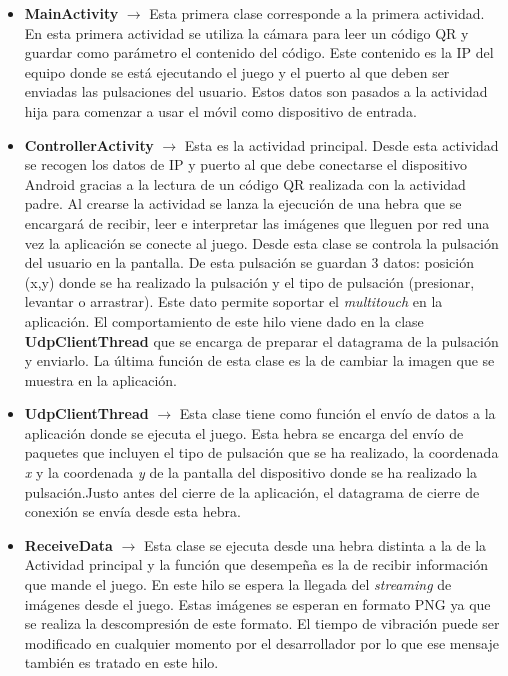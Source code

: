 \begin {itemize}
\item \textbf{MainActivity} $\rightarrow$ Esta primera clase corresponde a la primera actividad. En esta primera actividad se utiliza la c\'amara para leer un c\'odigo QR y guardar como par\'ametro el contenido del c\'odigo. Este contenido es la IP del equipo donde se est\'a ejecutando el juego y el puerto al que deben ser enviadas las pulsaciones del usuario. Estos datos son pasados a la actividad hija para comenzar a usar el m\'ovil como dispositivo de entrada.
\item \textbf{ControllerActivity} $\rightarrow$ Esta es la actividad principal. Desde esta actividad se recogen los datos de IP y puerto al que debe conectarse el dispositivo Android gracias a la lectura de un c\'odigo QR realizada con la actividad padre. Al crearse la actividad se lanza la ejecuci\'on de una hebra que se encargar\'a de recibir, leer e interpretar las im\'agenes que lleguen por red una vez la aplicaci\'on se conecte al juego. Desde esta clase se controla la pulsaci\'on del usuario en la pantalla. De esta pulsaci\'on se guardan 3 datos: posici\'on (x,y) donde se ha realizado la pulsaci\'on y el tipo de pulsaci\'on (presionar, levantar o arrastrar). Este dato permite soportar el \textit{multitouch} en la aplicaci\'on. El comportamiento de este hilo viene dado en la clase \textbf{UdpClientThread} que se encarga de preparar el datagrama de la pulsaci\'on y enviarlo. La \'ultima funci\'on de esta clase es la de cambiar la imagen que se muestra en la aplicaci\'on. 

\item \textbf{UdpClientThread} $\rightarrow$ Esta clase tiene como funci\'on el env\'io de datos a la aplicaci\'on donde se ejecuta el juego. Esta hebra se encarga del env\'io de paquetes que incluyen el tipo de pulsaci\'on que se ha realizado, la coordenada \textit{x} y la coordenada \textit{y} de la pantalla del dispositivo donde se ha realizado la pulsaci\'on.Justo antes del cierre de la aplicaci\'on, el datagrama de cierre de conexi\'on se env\'ia desde esta hebra.

\item \textbf{ReceiveData} $\rightarrow$ Esta clase se ejecuta desde una hebra distinta a la de la Actividad principal y la funci\'on que desempe\~na es la de recibir informaci\'on que mande el juego. En este hilo se espera la llegada del \textit{streaming} de im\'agenes desde el juego. Estas im\'agenes se esperan en formato PNG ya que se realiza la descompresi\'on de este formato. El tiempo de vibraci\'on puede ser modificado en cualquier momento por el desarrollador por lo que ese mensaje tambi\'en es tratado en este hilo.
\end {itemize}


